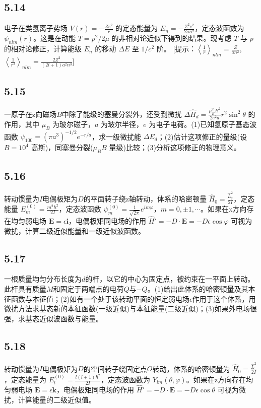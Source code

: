 \subsection{5.14}
电子在类氢离子势场 $V(r) = -\frac{Ze^2}{r}$ 的定态能量为 $E_n = -\frac{Z^2 e^2}{2an^2}$，定态波函数为 $\psi_{nlm}(r)$。这是在动能 $T = p^2 / 2\mu$ 的非相对论近似下得到的结果。现考虑 $T$ 与 $p$ 的相对论修正，计算能级 $E_n$ 的移动 $\Delta E$ 至 $1/c^2$ 阶。
[提示：$\left\langle \frac{1}{r} \right\rangle_{nlm} = \frac{Z}{an^2}$, $\left\langle \frac{1}{r^2} \right\rangle_{nlm} = \frac{2Z^2}{(2l+1)a^2 n^3}$]

\subsection{5.15}
一原子在z向磁场$B$中除了能级的塞曼分裂外，还受到微扰 $\Delta \hat{H}_d = \frac{\mu_B^2 B^2}{2e^2 a} r^2 \sin^2 \theta$ 的作用，其中 $\mu_B$ 为玻尔磁子，$a$ 为玻尔半径，$e$ 为电子电荷。(1)已知氢原子基态波函数 $\psi_{100} = (\pi a^3)^{-1/2} e^{-r/a}$，求一级微扰能 $\Delta E_d$；(2)估计这项修正的量级(设 $B = 10^4$ 高斯)，同塞曼分裂($\mu_B B$ 量级)比较；(3)分析这项修正的物理意义。

\subsection{5.16}
转动惯量为$I$电偶极矩为$D$的平面转子绕z轴转动，体系的哈密顿量 $\hat{H}_0 = \frac{\hat{L}_z^2}{2I}$，定态能量 $E_m^{(0)} = \frac{m^2 \hbar^2}{2I}$，定态波函数 $\psi_m^{(0)} = \frac{1}{\sqrt{2\pi}} e^{im\varphi}$，$m = 0, \pm 1, \cdots$。如果在x方向存在均匀弱电场 $\mathbf{E} = \epsilon \mathbf{i}$，电偶极矩同电场的作用 $\hat{H}' = -D \cdot \mathbf{E} = -D \epsilon \cos \varphi$ 可视为微扰，计算二级近似能量和一级近似波函数。

\subsection{5.17}
一根质量均匀分布长度为$d$的杆，以它的中心为固定点，被约束在一平面上转动。此杆具有质量$M$和固定于两端点的电荷$Q$与$-Q$。(1)给出此体系的哈密顿量及其本征函数与本征值；(2)如有一个处于该转动平面的恒定弱电场$\epsilon$作用于这个体系，用微扰方法求基态新的本征函数(一级近似)与本征能量(二级近似)；(3)如果外电场很强，求基态近似波函数与能量。

\subsection{5.18}
转动惯量为$I$电偶极矩为$D$的空间转子绕固定点$O$转动，体系的哈密顿量为 $\hat{H}_0 = \frac{\hat{L}^2}{2I}$，定态能量为 $E_l^{(0)} = \frac{l(l+1)\hbar^2}{2I}$，定态波函数为 $Y_{lm}(\theta, \varphi)$。如果在z方向存在均匀弱电场 $\mathbf{E} = \epsilon \mathbf{k}$，电偶极矩同电场的作用 $\hat{H}' = -D \cdot \mathbf{E} = -D \epsilon \cos \theta$ 可视为微扰，计算能量的二级近似值。

